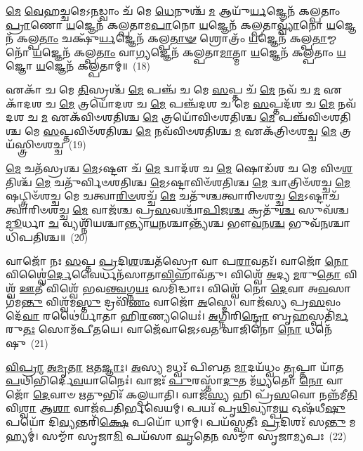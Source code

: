 \-\ul{𑌮𑍇} \ul{𑌵𑍇}\-𑌹𑌚𑍍𑌚𑌮𑍇\-𑌽\-\ul{𑌨}\-𑌡𑍍𑌵𑌾𑌂 𑌚᳴ 𑌮𑍇 \ul{𑌧𑍇}\-𑌨𑍁𑌶𑍍𑌚᳴ \ul{𑌮} 𑌆𑌯𑍁᳴\-\ul{𑌰𑍍𑌯}\-𑌜𑍍𑌞𑍇𑌨᳴ 𑌕𑌲𑍍𑌪𑌤𑌾𑌂 \ul{𑌪𑍍𑌰𑌾}\-𑌣𑍋 \ul{𑌯}\-𑌜𑍍𑌞𑍇𑌨᳴ 𑌕𑌲𑍍𑌪𑌤𑌾𑌮\-\ul{𑌪𑌾}\-𑌨𑍋 \ul{𑌯}\-𑌜𑍍𑌞𑍇𑌨᳴ 𑌕𑌲𑍍𑌪𑌤𑌾\-\ul{𑌵𑍍𑌵𑍍𑌯𑌾𑌁}\-𑌨𑍋 \ul{𑌯}\-𑌜𑍍𑌞𑍇𑌨᳴ 𑌕𑌲𑍍𑌪\-\ul{𑌤𑌾𑌂} 𑌚𑌕𑍍𑌷𑍁᳴\-\ul{𑌰𑍍𑌯}\-𑌜𑍍𑌞𑍇𑌨᳴ 𑌕𑌲𑍍𑌪\-\ul{𑌤𑌾}\-\-\ul{𑍟} 𑌶𑍍𑌰𑍋𑌤𑍍𑌰𑌂᳴ \ul{𑌯}\-𑌜𑍍𑌞𑍇𑌨᳴ 𑌕𑌲𑍍𑌪\-\ul{𑌤𑌾}\-𑌮𑍍𑌮𑌨𑍋᳴ \ul{𑌯}\-𑌜𑍍𑌞𑍇𑌨᳴ 𑌕𑌲𑍍𑌪\-\ul{𑌤𑌾𑌂} 𑌵𑌾\-\ul{𑌗𑍍𑌯}\-𑌜𑍍𑌞𑍇𑌨᳴ 𑌕𑌲𑍍𑌪𑌤𑌾\-\ul{𑌮𑌾}\-𑌤𑍍𑌮𑌾 \ul{𑌯}\-𑌜𑍍𑌞𑍇𑌨᳴ 𑌕𑌲𑍍𑌪𑌤𑌾𑌂 \ul{𑌯}\-𑌜𑍍𑌞𑍋 \ul{𑌯}\-𑌜𑍍𑌞𑍇𑌨᳴ 𑌕𑌲𑍍𑌪𑌤𑌾𑌮𑍍॥~(18)

{\anuvakamend[{\-\ul{𑌋}\-\-\ul{𑌷}\-𑌭𑌶𑍍𑌚᳴ 𑌚𑌤𑍍𑌵𑌾\-\ul{𑌰𑌿}\-\-\ul{𑍞}\-𑌶𑌚𑍍𑌚᳴}]}%

𑌏𑌕𑌾᳴ 𑌚 𑌮𑍇 \ul{𑌤𑌿}\-𑌸𑍍𑌰𑌶𑍍𑌚᳴ \ul{𑌮𑍇} 𑌪𑌞𑍍𑌚᳴ 𑌚 𑌮𑍇 \ul{𑌸}\-𑌪𑍍𑌤 𑌚᳴ \ul{𑌮𑍇} 𑌨𑌵᳴ 𑌚 \ul{𑌮} 𑌏𑌕𑌾᳴\-𑌦𑌶 𑌚 \ul{𑌮𑍇} 𑌤𑍍𑌰𑌯𑍋᳴𑌦𑌶 𑌚 \ul{𑌮𑍇} 𑌪𑌞𑍍𑌚᳴𑌦𑌶 𑌚 𑌮𑍇 \ul{𑌸}\-𑌪𑍍𑌤𑌦᳴𑌶 𑌚 \ul{𑌮𑍇} 𑌨𑌵᳴𑌦𑌶 𑌚 \ul{𑌮} 𑌏𑌕᳴𑌵𑌿𑍞𑌶𑌤𑌿𑌶𑍍𑌚 \ul{𑌮𑍇} 𑌤𑍍𑌰𑌯𑍋᳴𑌵𑌿𑍞𑌶𑌤𑌿𑌶𑍍𑌚 \ul{𑌮𑍇} 𑌪𑌞𑍍𑌚᳴𑌵𑌿𑍞𑌶𑌤𑌿𑌶𑍍𑌚 𑌮𑍇 \ul{𑌸}\-𑌪𑍍𑌤𑌵𑌿𑍞᳴𑌶𑌤𑌿𑌶𑍍𑌚 \ul{𑌮𑍇} 𑌨𑌵᳴𑌵𑌿𑍞𑌶𑌤𑌿𑌶𑍍𑌚 \ul{𑌮} 𑌏𑌕᳴𑌤𑍍𑌰𑌿𑍞𑌶𑌚𑍍𑌚 \ul{𑌮𑍇} 𑌤𑍍𑌰𑌯᳴𑌸𑍍𑌤𑍍𑌰𑌿𑍞𑌶𑌚𑍍𑌚~(19)

\-\ul{𑌮𑍇} 𑌚𑌤᳴𑌸𑍍𑌰𑌶𑍍𑌚 \ul{𑌮𑍇}\-\-𑌽𑌷𑍍𑌟𑍗 𑌚᳴ \ul{𑌮𑍇} 𑌦𑍍𑌵𑌾𑌦᳴𑌶 𑌚 \ul{𑌮𑍇} 𑌷𑍋𑌡᳴𑌶 𑌚 𑌮𑍇 𑌵𑌿𑍞\-\ul{𑌶}\-𑌤𑌿𑌶𑍍𑌚᳴ \ul{𑌮𑍇} 𑌚𑌤𑍁᳴𑌰𑍍𑌵𑌿𑍞𑌶𑌤𑌿𑌶𑍍𑌚 \ul{𑌮𑍇}\-\-𑌽𑌷𑍍𑌟𑌾𑌵𑌿𑍞᳴𑌶𑌤𑌿𑌶𑍍𑌚 \ul{𑌮𑍇} 𑌦𑍍𑌵𑌾𑌤𑍍𑌰𑌿𑍞᳴𑌶𑌚𑍍𑌚 \ul{𑌮𑍇} 𑌷𑌟𑍍𑌤𑍍𑌰𑌿𑍞᳴𑌶𑌚𑍍𑌚 𑌮𑍇 𑌚𑌤𑍍𑌵𑌾\-\ul{𑌰𑌿}\-\-\ul{𑍞}\-𑌶𑌚𑍍𑌚᳴ \ul{𑌮𑍇} 𑌚𑌤𑍁᳴𑌶𑍍𑌚𑌤𑍍𑌵𑌾𑌰𑌿𑍞𑌶𑌚𑍍𑌚 \ul{𑌮𑍇}\-\-𑌽𑌷𑍍𑌟𑌾𑌚᳴𑌤𑍍𑌵𑌾𑌰𑌿𑍞𑌶𑌚𑍍𑌚 \ul{𑌮𑍇} 𑌵𑌾𑌜᳴𑌶𑍍𑌚 𑌪𑍍𑌰\-\ul{𑌸}\-𑌵𑌶𑍍𑌚𑌾᳴\-\ul{𑌪𑌿}\-𑌜\-\ul{𑌶𑍍𑌚} 𑌕𑍍𑌰𑌤𑍁᳴\-\ul{𑌶𑍍𑌚} 𑌸𑍁𑌵᳴𑌶𑍍𑌚 \ul{𑌮𑍂}\-𑌰𑍍𑌧𑌾 \ul{𑌚} 𑌵𑍍𑌯𑌶𑍍𑌨𑌿᳴𑌯𑌶𑍍𑌚𑌾𑌨𑍍𑌤𑍍𑌯𑌾\-\ul{𑌯}\-𑌨𑌶𑍍𑌚𑌾𑌨𑍍𑌤𑍍𑌯᳴𑌶𑍍𑌚 𑌭𑍗\-\ul{𑌵}\-𑌨\-\ul{𑌶𑍍𑌚} 𑌭𑍁𑌵᳴\-\ul{𑌨}\-𑌶𑍍𑌚𑌾𑌧𑌿᳴𑌪𑌤𑌿𑌶𑍍𑌚॥~(20)

{\anuvakamend[{𑌤𑍍𑌰𑌯᳴𑌸𑍍𑌤𑍍𑌰𑌿𑍞𑌶\-\ul{𑌚𑍍𑌚} 𑌵𑍍𑌯𑌶𑍍𑌞𑌿᳴\-\ul{𑌯} 𑌏𑌕𑌾᳴\-𑌦𑌶 𑌚}]}%

𑌵𑌾𑌜𑍋᳴ 𑌨𑌃 \ul{𑌸}\-𑌪𑍍𑌤 \ul{𑌪𑍍𑌰}\-𑌦𑌿\-\ul{𑌶}\-𑌶𑍍𑌚𑌤᳴𑌸𑍍𑌰𑍋 𑌵𑌾 𑌪\-\ul{𑌰𑌾}\-𑌵𑌤𑌃᳴। 𑌵𑌾𑌜𑍋᳴ \ul{𑌨𑍋} 𑌵𑌿𑌶𑍍𑌵𑍈॑\-\ul{𑌰𑍍𑌦𑍇}\-𑌵𑍈𑌰𑍍𑌧𑌨᳴𑌸𑌾𑌤𑌾\-\ul{𑌵𑌿}\-𑌹𑌾𑌵᳴𑌤𑍁। 𑌵𑌿𑌶𑍍𑌵𑍇᳴ \ul{𑌅}\-𑌦𑍍𑌯 \ul{𑌮}\-𑌰𑍁\-\ul{𑌤𑍋} 𑌵𑌿𑌶𑍍𑌵᳴ \ul{𑌊}\-𑌤𑍀 𑌵𑌿𑌶𑍍𑌵𑍇᳴ 𑌭𑌵\-\ul{𑌨𑍍𑌤𑍍𑌵}\-𑌗𑍍𑌨\-\ul{𑌯𑌃} 𑌸𑌮𑌿᳴𑌦𑍍𑌧𑌾𑌃। 𑌵𑌿𑌶𑍍𑌵𑍇᳴ 𑌨𑍋 \ul{𑌦𑍇}\-𑌵𑌾 𑌅\-\ul{𑌵}\-𑌸𑌾 𑌗᳴𑌮\-\ul{𑌨𑍍𑌤𑍁} 𑌵𑌿𑌶𑍍𑌵᳴𑌮\-\ul{𑌸𑍍𑌤𑍁} 𑌦𑍍𑌰𑌵𑌿᳴\-\ul{𑌣𑌂} 𑌵𑌾𑌜𑍋᳴ \ul{𑌅}\-𑌸𑍍𑌮𑍇। 𑌵𑌾𑌜᳴𑌸𑍍𑌯 𑌪𑍍𑌰\-\ul{𑌸}\-𑌵𑌂 𑌦𑍇᳴\-\ul{𑌵𑌾} 𑌰𑌥𑍈॑𑌰𑍍𑌯𑌾𑌤𑌾 𑌹𑌿\-\ul{𑌰}\-𑌣𑍍𑌯𑌯𑍈𑌃॑। \ul{𑌅}\-𑌗𑍍𑌨𑌿𑌰𑌿\-\ul{𑌨𑍍𑌦𑍍𑌰𑍋} 𑌬𑍃\-\ul{𑌹}\-𑌸𑍍𑌪𑌤𑌿᳴\-\ul{𑌰𑍍𑌮}\-𑌰𑍁\-\ul{𑌤𑌃} 𑌸𑍋𑌮᳴𑌪𑍀𑌤𑌯𑍇। 𑌵𑌾𑌜𑍇᳴𑌵𑌾𑌜𑍇\-𑌽𑌵𑌤 𑌵𑌾𑌜𑌿𑌨𑍋 \ul{𑌨𑍋} 𑌧𑌨𑍇᳴𑌷𑍁~(21)

\-\ul{𑌵𑌿}\-\-\ul{𑌪𑍍𑌰𑌾} \ul{𑌅}\-\-\ul{𑌮𑍃}\-\-\ul{𑌤𑌾} \ul{𑌋}\-\-\ul{𑌤}\-\-\ul{𑌜𑍍𑌞𑌾𑌃}\-। \ul{𑌅}\-𑌸𑍍𑌯 𑌮𑌧𑍍𑌵𑌃᳴ 𑌪𑌿𑌬𑌤 \ul{𑌮𑌾}\-𑌦𑌯᳴𑌧𑍍𑌵𑌂 \ul{𑌤𑍃}\-𑌪𑍍𑌤𑌾 𑌯𑌾᳴𑌤 \ul{𑌪}\-𑌥𑌿𑌭𑌿᳴𑌰𑍍𑌦𑍇\-\ul{𑌵}\-𑌯𑌾𑌨𑍈𑌃॑। 𑌵𑌾𑌜𑌃᳴ \ul{𑌪𑍁}\-𑌰𑌸𑍍𑌤𑌾᳴\-\ul{𑌦𑍁}\-𑌤 𑌮᳴\-\ul{𑌧𑍍𑌯}\-𑌤𑍋 \ul{𑌨𑍋} 𑌵𑌾𑌜𑍋᳴ \ul{𑌦𑍇}\-𑌵𑌾𑍞 \ul{𑌋}\-𑌤𑍁𑌭𑌿𑌃᳴ 𑌕𑌲𑍍𑌪𑌯𑌾𑌤𑌿। 𑌵𑌾𑌜᳴\-\ul{𑌸𑍍𑌯} 𑌹𑌿 𑌪𑍍𑌰᳴\-\ul{𑌸}\-𑌵𑍋 𑌨𑌨𑍍𑌨᳴𑌮𑍀\-\ul{𑌤𑌿} 𑌵𑌿\-\ul{𑌶𑍍𑌵𑌾} 𑌆\-\ul{𑌶𑌾} 𑌵𑌾𑌜᳴𑌪𑌤𑌿𑌰𑍍𑌭𑌵𑍇𑌯𑌮𑍍। 𑌪𑌯𑌃᳴ 𑌪𑍃\-\ul{𑌥𑌿}\-𑌵𑍍𑌯𑌾𑌮𑍍𑌪\-\ul{𑌯} 𑌓𑌷᳴𑌧𑍀\-\ul{𑌷𑍁} 𑌪𑌯𑍋᳴ 𑌦𑌿\-\ul{𑌵𑍍𑌯}\-𑌨𑍍𑌤𑌰𑌿᳴\-\ul{𑌕𑍍𑌷𑍇} 𑌪𑌯𑍋᳴ 𑌧𑌾𑌮𑍍। 𑌪𑌯᳴𑌸𑍍𑌵𑌤𑍀𑌃 \ul{𑌪𑍍𑌰}\-𑌦𑌿𑌶𑌃᳴ 𑌸\-\ul{𑌨𑍍𑌤𑍁} 𑌮𑌹𑍍𑌯𑌮𑍍॑। 𑌸𑌮𑍍𑌮𑌾᳴ 𑌸𑍃𑌜𑌾\-\ul{𑌮𑌿} 𑌪𑌯᳴𑌸𑌾 \ul{𑌘𑍃}\-𑌤𑍇\-\ul{𑌨} 𑌸𑌮𑍍𑌮𑌾᳴ 𑌸𑍃𑌜𑌾\-\ul{𑌮𑍍𑌯}\-𑌪𑌃~(22)

